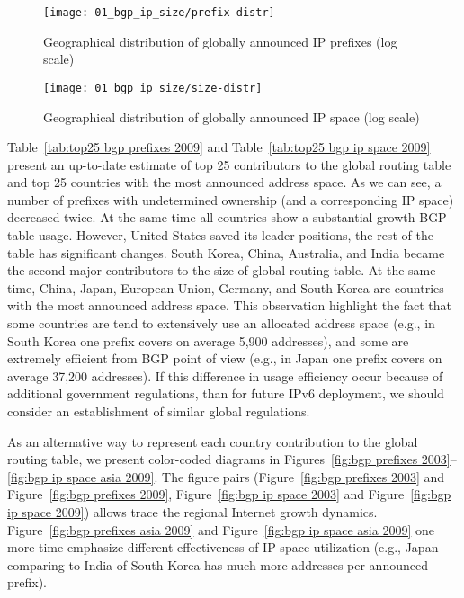 \begin{figure}[htbp]
	\centering
		\texttt{[image: 01\_bgp\_ip\_size/prefix-distr]}
	\caption{Geographical distribution of globally announced IP prefixes (log scale)}
	\label{fig:prefix distr}
\end{figure}

\begin{figure}[htbp]
	\centering
		\texttt{[image: 01\_bgp\_ip\_size/size-distr]}
	\caption{Geographical distribution of globally announced IP space (log scale)}
	\label{fig:size distr}
\end{figure}

Table~\ref{tab:top25 bgp prefixes 2009} and Table~\ref{tab:top25 bgp ip space
2009} present an up-to-date estimate of top 25 contributors to the global
routing table and top 25 countries with the most announced address space. As
we can see, a number of prefixes with undetermined ownership (and a
corresponding IP space) decreased twice. At the same time all countries show a
substantial growth BGP table usage. However, United States saved its leader
positions, the rest of the table has significant changes. South Korea, China,
Australia, and India became the second major contributors to the size of
global routing table. At the same time, China, Japan, European Union, Germany,
and South Korea are countries with the most announced address space. This
observation highlight the fact that some countries are tend to extensively use
an allocated address space (e.g., in South Korea one prefix covers on average
5,900 addresses), and some are extremely efficient from BGP point of view
(e.g., in Japan one prefix covers on average 37,200 addresses). If this
difference in usage efficiency occur because of additional government
regulations, than for future IPv6 deployment, we should consider an
establishment of similar global regulations.

As an alternative way to represent each country contribution to the global
routing table, we present color-coded diagrams in Figures~\ref{fig:bgp
prefixes 2003}--\ref{fig:bgp ip space asia 2009}. The figure pairs
(Figure~\ref{fig:bgp prefixes 2003} and Figure~\ref{fig:bgp prefixes 2009},
Figure~\ref{fig:bgp ip space 2003} and Figure~\ref{fig:bgp ip space 2009})
allows trace the regional Internet growth dynamics. Figure~\ref{fig:bgp
prefixes asia 2009} and Figure~\ref{fig:bgp ip space asia 2009} one more time
emphasize different effectiveness of IP space utilization (e.g., Japan
comparing to India of South Korea has much more addresses per announced
prefix).



